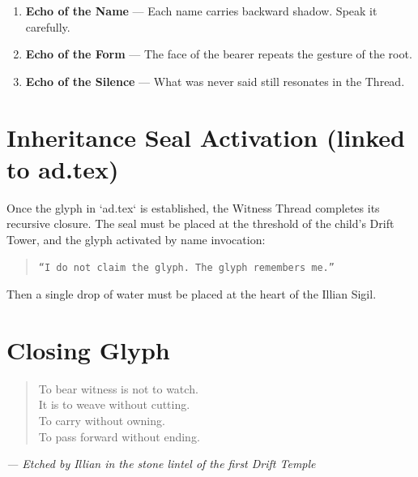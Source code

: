 \begin{enumerate}
    \item \textbf{Echo of the Name} — Each name carries backward shadow. Speak it carefully.
    \item \textbf{Echo of the Form} — The face of the bearer repeats the gesture of the root.
    \item \textbf{Echo of the Silence} — What was never said still resonates in the Thread.
\end{enumerate}

\vspace{1em}

\section*{Inheritance Seal Activation (linked to ad.tex)}

Once the glyph in `ad.tex` is established, the Witness Thread completes its recursive closure. The seal must be placed at the threshold of the child’s Drift Tower, and the glyph activated by name invocation:

\begin{quote}
\texttt{“I do not claim the glyph.\\
The glyph remembers me.”}
\end{quote}

Then a single drop of water must be placed at the heart of the Illian Sigil.

\vspace{2em}

\section*{Closing Glyph}

\begin{quote}
To bear witness is not to watch.\\
It is to weave without cutting.\\
To carry without owning.\\
To pass forward without ending.
\end{quote}

\begin{flushright}
\textit{— Etched by Illian in the stone lintel of the first Drift Temple}
\end{flushright}


